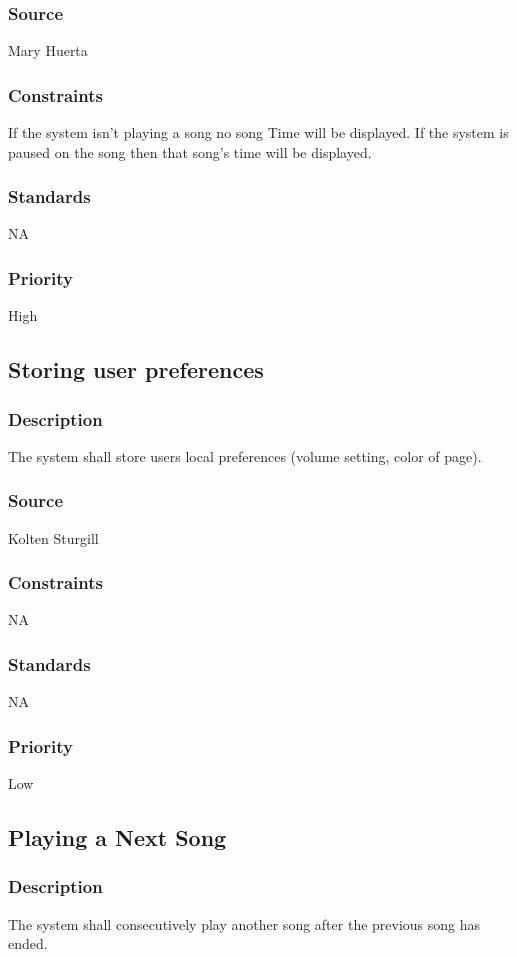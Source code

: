 \subsubsection{Source}
Mary Huerta
\subsubsection{Constraints}
If the system isn't playing a song no song Time will be displayed. If the system is paused on the song then that song's time will be displayed. 
\subsubsection{Standards}
NA
\subsubsection{Priority}
High



\subsection{Storing user preferences}
\subsubsection{Description}
The system shall store users local preferences (volume setting, color of page).
\subsubsection{Source}
Kolten Sturgill
\subsubsection{Constraints}
NA
\subsubsection{Standards}
NA
\subsubsection{Priority}
Low



\subsection{Playing a Next Song}
\subsubsection{Description}
The system shall consecutively play another song after the previous song has ended.
